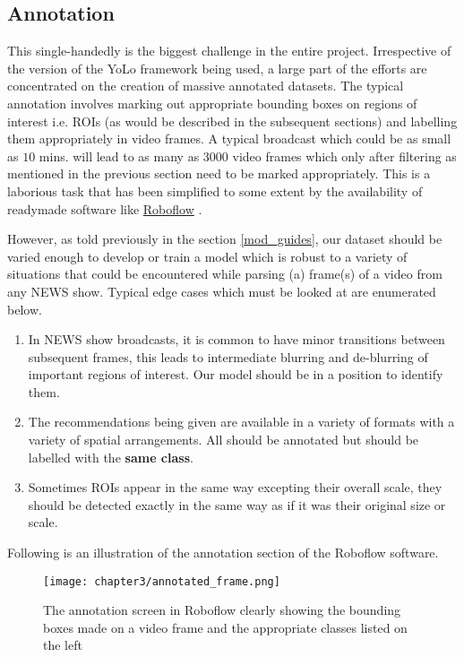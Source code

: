 \subsection{Annotation}
This single-handedly is the biggest challenge in the entire project. Irrespective of the version of the YoLo framework being used, a large part of the efforts are concentrated on the creation of massive annotated datasets. The typical annotation involves marking out appropriate bounding boxes on regions of interest i.e. ROIs (as would be described in the subsequent sections) and labelling them appropriately in video frames. A typical broadcast which could be as small as $10$ mins. will lead to as many as $3000$ video frames which only after filtering as mentioned in the previous section need to be marked appropriately. This is a laborious task that has been simplified to some extent by the availability of readymade software like \href{https://roboflow.com/annotate}{Roboflow} \cite{rb2022}. \par

However, as told previously in the section \ref{mod_guides}, our dataset should be varied enough to develop or train a model which is robust to a variety of situations that could be encountered while parsing (a) frame(s) of a video from any NEWS show. Typical edge cases which must be looked at are enumerated below.
\begin{enumerate}
 \item In NEWS show broadcasts, it is common to have minor transitions between subsequent frames, this leads to intermediate blurring and de-blurring of important regions of interest. Our model should be in a position to identify them.
 \item The recommendations being given are available in a variety of formats with a variety of spatial arrangements. All should be annotated but should be labelled with the \textbf{same class}.
 \item Sometimes ROIs appear in the same way excepting their overall scale, they should be detected exactly in the same way as if it was their original size or scale.
\end{enumerate}
Following is an illustration of the annotation section of the Roboflow software.

\begin{figure}[h]
  \centering
  \texttt{[image: chapter3/annotated\_frame.png]}
  \caption{The annotation screen in Roboflow clearly showing the bounding boxes made on a video frame and the appropriate classes listed on the left}
  \label{fig:annot_frame}
\end{figure}

